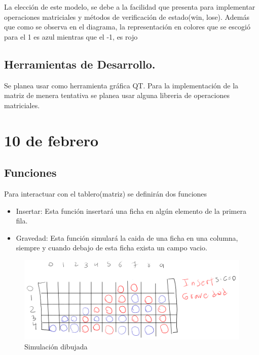 \documentclass[12pt,a4paper]{article}
\begin{document}
La elección de este modelo, se debe a la facilidad que presenta para implementar operaciones matriciales y métodos de verificación de estado(win, lose).
Además que como se observa en el diagrama, la representación en colores que se escogió para el 1 es azul mientras que el -1, es rojo

\subsection{Herramientas de Desarrollo.}

Se planea usar como herramienta gráfica QT.
Para la implementación de la matriz de menera tentativa se planea usar alguna libreria de operaciones matriciales.

\section{10 de febrero}
\subsection{Funciones}

Para interactuar con el tablero(matriz) se definirán dos funciones
\begin{itemize}
  \item Insertar: Esta función insertará una ficha en algún elemento de la
        primera fila.

  \item Gravedad: Esta función simulará la caida de una ficha en una columna,
        siempre y cuando debajo de esta ficha exista un campo vacio.
\end{itemize}

\begin{figure}[H]
    \centering
    \includegraphics[width=\linewidth]{imagenes/draw.png}
    \caption{Simulación dibujada}
    \label{fig:draw_simulation}
\end{figure}
\end{document}
